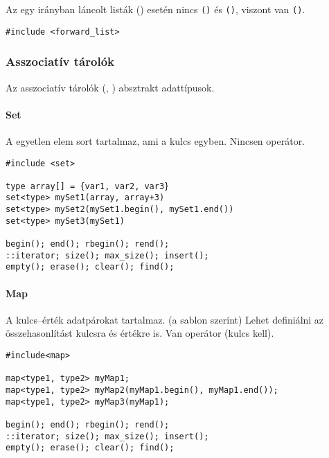 \documentclass[../../main.tex]{subfiles}
\begin{document}
Az egy irányban láncolt listák ()
esetén nincs \texttt{()} és
\texttt{()}, viszont van
\texttt{()}.

\begin{verbatim}
#include <forward_list>
\end{verbatim}

\subsubsection*{Asszociatív tárolók}

Az asszociatív tárolók (, ) absztrakt adattípusok.

\paragraph*{Set}

A  egyetlen elem sort tartalmaz, ami a kulcs egyben. Nincsen
\blackc{[]} operátor.

\begin{verbatim}
#include <set>

type array[] = {var1, var2, var3}
set<type> mySet1(array, array+3)
set<type> mySet2(mySet1.begin(), mySet1.end())
set<type> mySet3(mySet1)

begin(); end(); rbegin(); rend();
::iterator; size(); max_size(); insert();
empty(); erase(); clear(); find();
\end{verbatim}

\paragraph*{Map}

A  kulcs--érték adatpárokat tartalmaz. (a  sablon szerint)
Lehet definiálni az összehasonlítást kulcsra és értékre is. Van \blackc{[]}
operátor (kulcs kell).

\begin{verbatim}
#include<map>

map<type1, type2> myMap1;
map<type1, type2> myMap2(myMap1.begin(), myMap1.end());
map<type1, type2> myMap3(myMap1);

begin(); end(); rbegin(); rend();
::iterator; size(); max_size(); insert();
empty(); erase(); clear(); find();
\end{verbatim}
\end{document}
